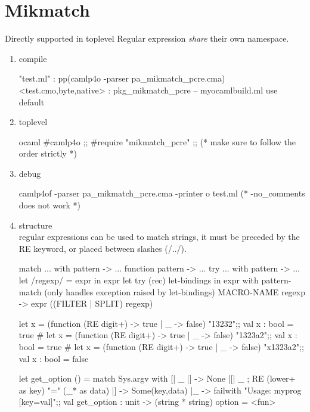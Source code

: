 \section{Mikmatch}
\label{sec:mikmatch}
Directly supported in toplevel
Regular expression \emph{share} their own namespace.
\begin{enumerate}
\item compile
\begin{bluetext}
"test.ml" : pp(camlp4o -parser pa_mikmatch_pcre.cma)
<test.{cmo,byte,native}> : pkg_mikmatch_pcre
-- myocamlbuild.ml use default 
\end{bluetext}
\item toplevel
\begin{redcode}
ocaml
#camlp4o ;;
#require "mikmatch_pcre" ;; (* make sure to follow the order strictly *)
\end{redcode}
\item debug

  \begin{bluetext}
camlp4of -parser pa_mikmatch_pcre.cma -printer o test.ml
(* -no_comments does not work    *)
\end{bluetext}

\item structure \\
  regular expressions can be used to match strings, it must be preceded by
  the RE keyword, or placed between slashes (/../).

  \begin{bluecode}
    match ... with pattern -> ...
    function pattern -> ...
    try ... with pattern -> ... 
    let /regexp/ = expr in expr
    let try (rec) let-bindings in expr with pattern-match
    (only handles exception raised by let-bindings)
    MACRO-NAME regexp -> expr ((FILTER | SPLIT) regexp)
    
  \end{bluecode}

  \begin{alternate}
let x = (function (RE digit+) -> true | _ -> false) "13232";;
val x : bool = true
# let x = (function (RE digit+) -> true | _ -> false) "1323a2";;
val x : bool = true
# let x = (function (RE digit+) -> true | _ -> false) "x1323a2";;
val x : bool = false    
\end{alternate}

\begin{bluecode}
let get_option () = match Sys.argv with 
     [| _ |] -> None 
    |[| _ ; RE (lower+ as key) "=" (_* as data) |] -> Some(key,data)
    |_ -> failwith "Usage: myprog [key=val]";;
val get_option : unit -> (string * string) option = <fun>
\end{bluecode}


\end{enumerate}
